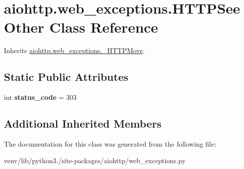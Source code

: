 \hypertarget{classaiohttp_1_1web__exceptions_1_1_h_t_t_p_see_other}{}\section{aiohttp.\+web\+\_\+exceptions.\+H\+T\+T\+P\+See\+Other Class Reference}
\label{classaiohttp_1_1web__exceptions_1_1_h_t_t_p_see_other}


Inherits \hyperlink{classaiohttp_1_1web__exceptions_1_1___h_t_t_p_move}{aiohttp.\+web\+\_\+exceptions.\+\_\+\+H\+T\+T\+P\+Move}.

\subsection*{Static Public Attributes}
\begin{DoxyCompactItemize}
\item 
\mbox{\label{classaiohttp_1_1web__exceptions_1_1_h_t_t_p_see_other_ab7a459b1df6086f8d66868d599e1c83f}} 
int {\bfseries status\+\_\+code} = 303
\end{DoxyCompactItemize}
\subsection*{Additional Inherited Members}


The documentation for this class was generated from the following file\+:\begin{DoxyCompactItemize}
\item 
venv/lib/python3./site-\/packages/aiohttp/web\+\_\+exceptions.\+py\end{DoxyCompactItemize}

